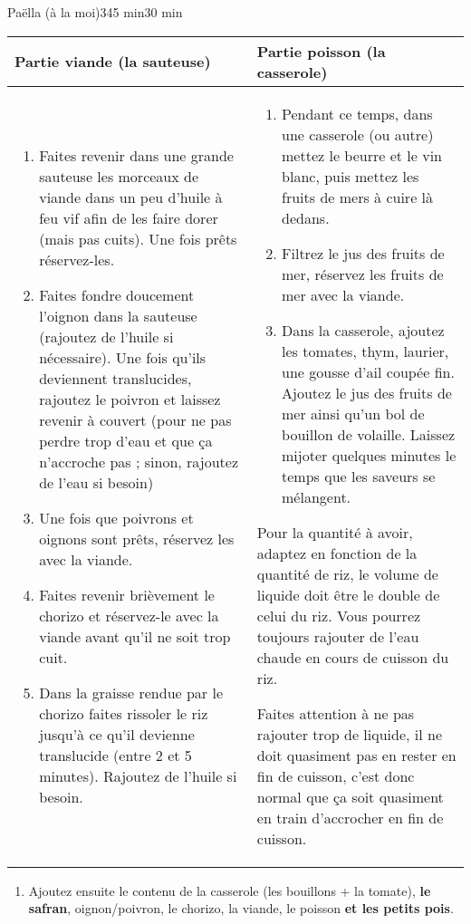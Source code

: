 \begin{recette}{Paëlla (à la moi)}{3}{45 min}{30 min}
\begin{preparation*}
\begin{tabular}{p{}|p{}}
Partie viande (la sauteuse)& Partie poisson (la casserole)\\\hline
\begin{enumerate}
\item Faites revenir dans une grande sauteuse les morceaux de viande dans un peu d'huile à feu vif afin de les faire dorer (mais pas cuits). Une fois prêts réservez-les.
\item Faites fondre doucement l'oignon dans la sauteuse (rajoutez de l'huile si nécessaire). Une fois qu'ils deviennent translucides, rajoutez le poivron et laissez revenir à couvert (pour ne pas perdre trop d'eau et que ça n'accroche pas ; sinon, rajoutez de l'eau si besoin)
\item Une fois que poivrons et oignons sont prêts, réservez les avec la viande.
\item Faites revenir brièvement le chorizo et réservez-le avec la viande avant qu'il ne soit trop cuit. 
\item Dans la graisse rendue par le chorizo faites rissoler le riz jusqu'à ce qu'il devienne translucide (entre 2 et 5 minutes). Rajoutez de l'huile si besoin.
\end{enumerate}&\begin{enumerate}
\item Pendant ce temps, dans une casserole (ou autre) mettez le beurre et le vin blanc, puis mettez les fruits de mers à cuire là dedans\footnotemark.
\item Filtrez le jus des fruits de mer, réservez les fruits de mer avec la viande. 
\item Dans la casserole, ajoutez les tomates, thym, laurier, une gousse d'ail coupée fin. Ajoutez le jus des fruits de mer ainsi qu'un bol de bouillon de volaille. Laissez mijoter quelques minutes le temps que les saveurs se mélangent.
\end{enumerate}
\begin{remarque}
Pour la quantité à avoir, adaptez en fonction de la quantité de riz, le volume de liquide doit être le double de celui du riz. Vous pourrez toujours rajouter de l'eau chaude en cours de cuisson du riz.

Faites attention à ne pas rajouter trop de liquide, il ne doit quasiment pas en rester en fin de cuisson, c'est donc normal que ça soit quasiment en train d'accrocher en fin de cuisson.
\end{remarque}
\end{tabular}
\begin{enumerate}
\item Ajoutez ensuite le contenu de la casserole (les bouillons + la tomate), \textbf{le safran}, oignon/poivron, le chorizo, la viande, le poisson \textbf{et les petits pois}.
\end{enumerate}
\end{preparation*}


\end{recette}
